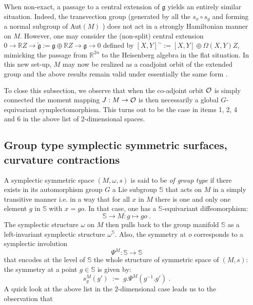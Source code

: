 \documentclass{article}
\renewcommand{\SS}{\mathbb S}
\newcommand{\R}{\mathbb R}
\renewcommand{\gg}{\mathfrak g}
\def\co{{\cal O}}
\def \R{{\mathbb R}}
\begin{document}
\vspace{2mm}

\noindent When non-exact, a passage to a central extension of  $\gg$ yields an entirely
similar situation. Indeed, the transvection group (generated by all the $s_x \circ s_y$ and forming a normal subgroup of Aut$(M)$ ) does not act in a strongly Hamiltonian manner on $M$.
However, one may consider the (non-split) central extension $0\to\R Z\to\tilde{\gg}:=\gg\oplus\R Z\to\gg\to0$ defined by $[X,Y]^{\sim}:=[X,Y]\oplus\Omega(X,Y)Z$, mimicking the passage from $\R^{2n}$ to the Heisenberg algebra in the flat situation. In this new set-up, $M$ may now be realized as a coadjoint orbit of the extended group and the above results remain valid under essentially the same form \cite{Bithese}.

\vspace{2mm}

\noindent To close this subsection, we observe that when the co-adjoint orbit $\co$ is simply connected
the moment mapping $J:M\to \co$ is then necessarily a global $G$-equivariant symplectomorphism. This turns out to be the case in items 1, 2, 4 and 6 in the above list of 2-dimensional spaces.

\subsection{Group type symplectic symmetric surfaces, curvature contractions}
A symplectic symmetric space $(M,\omega,s)$ is said to be {\sl of group type} if there exists in its
automorphism group $G$ a Lie subgroup $\SS$ that acts on $M$ in a simply transitive manner i.e.
in a way that for all $x$ in $M$ there is one and only one element $g$ in $\SS$ with $x=go$. In that
case, one has a $\SS$-equivariant diffeomorphism:
\begin{equation}
\SS\to M:g\mapsto go\;.
\end{equation}
The symplectic structure $\omega$ on $M$ then pulls back to the group manifold $\SS$ as a left-invariant
symplectic structure $\omega^\SS$. Also, the symmetry at $o$ corresponds to a symplectic involution
\begin{equation}
\Psi^M:\SS\to\SS
\end{equation}
that encodes at the level of $\SS$ the  whole structure of symmetric space of $(M,s)$:
the symmetry at a point $g\in\SS$ is given by:
\begin{equation}
s^M_g(g')\;:=\;g.\Psi^M(g^{-1}.g')\;.
\end{equation}
A quick look at the above list in the 2-dimensional case leads us to the observation that
\end{document}
